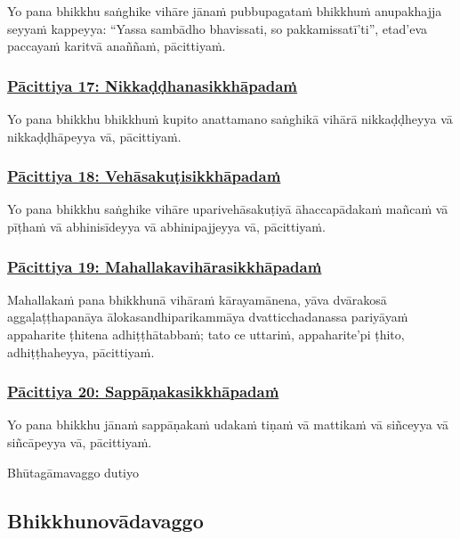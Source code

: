 Yo pana bhikkhu saṅghike vihāre jānaṁ pubbupagataṁ bhikkhuṁ anupakhajja seyyaṁ kappeyya: ``Yassa sambādho bhavissati, so pakkamissatī'ti'', etad'eva paccayaṁ karitvā anaññaṁ, pācittiyaṁ.

\subsubsection*{\hyperref[exp17]{Pācittiya 17: Nikkaḍḍhanasikkhāpadaṁ}}
\label{pac17}

Yo pana bhikkhu bhikkhuṁ kupito anattamano saṅghikā vihārā nikkaḍḍheyya vā nikkaḍḍhāpeyya vā, pācittiyaṁ.

\subsubsection*{\hyperref[exp18]{Pācittiya 18: Vehāsakuṭisikkhāpadaṁ}}
\label{pac18}

Yo pana bhikkhu saṅghike vihāre uparivehāsakuṭiyā āhaccapādakaṁ mañcaṁ vā pīṭhaṁ vā abhinisīdeyya vā abhinipajjeyya vā, pācittiyaṁ.

\subsubsection*{\hyperref[exp19]{Pācittiya 19: Mahallakavihārasikkhāpadaṁ}}
\label{pac19}

Mahallakaṁ pana bhikkhunā vihāraṁ kārayamānena, yāva dvārakosā aggaḷaṭṭhapanāya ālokasandhiparikammāya dvatticchadanassa pariyāyaṁ appaharite ṭhitena adhiṭṭhātabbaṁ; tato ce uttariṁ, appaharite'pi ṭhito, adhiṭṭhaheyya, pācittiyaṁ.

\subsubsection*{\hyperref[exp20]{Pācittiya 20: Sappāṇakasikkhāpadaṁ}}
\label{pac20}

Yo pana bhikkhu jānaṁ sappāṇakaṁ udakaṁ tiṇaṁ vā mattikaṁ vā siñceyya vā siñcāpeyya vā, pācittiyaṁ.

\begin{center}
  Bhūtagāmavaggo dutiyo
\end{center}

\subsection{Bhikkhunovādavaggo}
\vspace{0.2cm}

